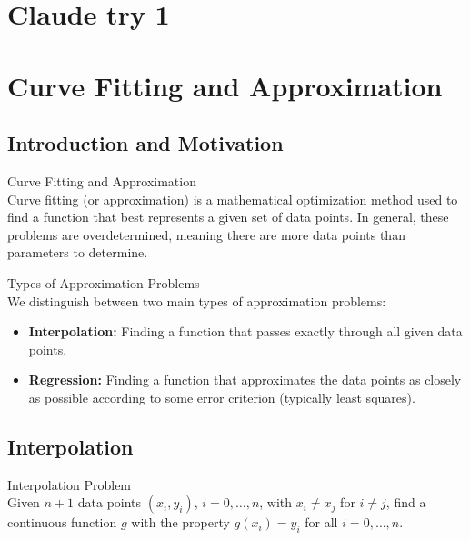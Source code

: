 \raggedcolumns

\section{Claude try 1}

\section{Curve Fitting and Approximation}

\subsection{Introduction and Motivation}

\begin{definition}{Curve Fitting and Approximation}\\
Curve fitting (or approximation) is a mathematical optimization method used to find a function that best represents a given set of data points. In general, these problems are overdetermined, meaning there are more data points than parameters to determine.
\end{definition}

\begin{concept}{Types of Approximation Problems}\\
We distinguish between two main types of approximation problems:

\begin{itemize}
    \item \textbf{Interpolation:} Finding a function that passes exactly through all given data points.
    \item \textbf{Regression:} Finding a function that approximates the data points as closely as possible according to some error criterion (typically least squares).
\end{itemize}
\end{concept}

\subsection{Interpolation}

\begin{definition}{Interpolation Problem}\\
Given $n+1$ data points $(x_i, y_i)$, $i=0,\ldots,n$, with $x_i \neq x_j$ for $i \neq j$, find a continuous function $g$ with the property $g(x_i) = y_i$ for all $i=0,\ldots,n$.
\end{definition}

